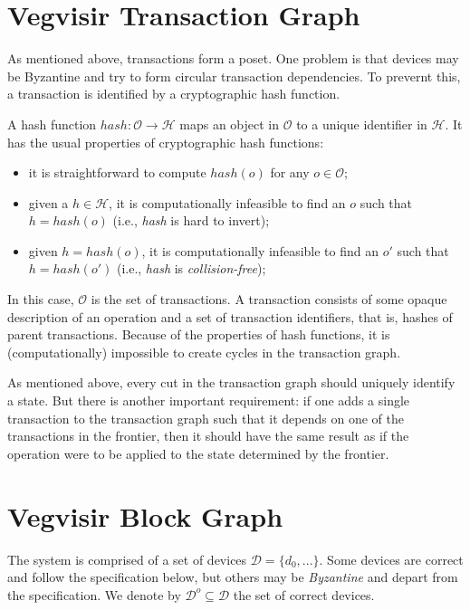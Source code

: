 \documentclass{article}
\begin{document}
\section{Vegvisir Transaction Graph}

As mentioned above, transactions form a poset.  One problem is that
devices may be Byzantine and try to form circular transaction dependencies.
To prevernt this, a transaction is identified by a cryptographic hash function.

A hash function $\mathit{hash}: \mathcal{O} \rightarrow \mathcal{H}$ maps an object in $\mathcal{O}$ to a unique identifier in $\mathcal{H}$.
It has the usual properties of cryptographic hash functions:
\begin{itemize}
\item it is straightforward to compute $\mathit{hash}(o)$ for any $o \in \mathcal{O}$;
\item given a $h \in \mathcal{H}$, it is computationally infeasible to find an $o$ such that $h = \mathit{hash}(o)$ (i.e., \textit{hash} is hard to invert);
\item given $h = \mathit{hash}(o)$, it is computationally infeasible to find an $o'$ such that $h = \mathit{hash}(o')$ (i.e., \textit{hash} is \emph{collision-free});
\end{itemize}

In this case, $\mathcal{O}$ is the set of transactions.  A transaction
consists of some opaque description of an operation and a set of
transaction identifiers, that is, hashes of parent transactions.
Because of the properties of hash functions,
it is (computationally) impossible to create cycles in the transaction
graph.

As mentioned above, every cut in the transaction graph should uniquely
identify a state.  But there is another important requirement:
if one adds a single transaction to the transaction graph such that it
depends on one of the transactions in the frontier, then it should
have the same result as if the operation were to be applied to the
state determined by the frontier.

\section{Vegvisir Block Graph}

The system is comprised of a set of devices $\mathcal{D} = \{ d_0, ... \}$.
Some devices are correct and follow the specification below,
but others may be \emph{Byzantine} and depart from the specification.  We denote by
$\mathcal{D}^o \subseteq \mathcal{D}$ the set of correct devices.
\end{document}
